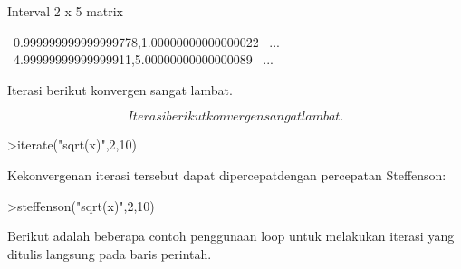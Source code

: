 \documentclass{article}
\begin{document}
\begin{eulernotebook}
\begin{eulercomment}
\begin{eulercomment}
\begin{eulercomment}
\begin{eulercomment}
\begin{eulercomment}
\begin{eulercomment}
\begin{eulercomment}
\begin{eulercomment}
\begin{eulercomment}
\begin{eulercomment}
\begin{eulercomment}
\begin{eulercomment}
\begin{eulercomment}
\begin{eulercomment}
\begin{eulercomment}
\begin{eulercomment}
\begin{eulercomment}
\begin{eulercomment}
\begin{eulercomment}
\begin{eulercomment}
\begin{eulercomment}
\begin{eulercomment}
\begin{eulercomment}
\begin{eulercomment}
\begin{eulercomment}
\begin{eulercomment}
\begin{eulercomment}
\begin{eulercomment}
\begin{eulercomment}
\begin{eulercomment}
\begin{eulercomment}
\begin{eulercomment}
\begin{eulerprompt}
\end{eulerprompt}
\begin{euleroutput}
  Interval 2 x 5 matrix
  
  ~0.999999999999999778,1.00000000000000022~     ...
  ~4.99999999999999911,5.00000000000000089~     ...
\end{euleroutput}
\begin{eulercomment}
Iterasi berikut konvergen sangat lambat.

\end{eulercomment}
\begin{eulerformula}
\[
Iterasi berikut konvergen sangat lambat.
\]
\end{eulerformula}
\begin{eulerprompt}
>iterate("sqrt(x)",2,10)
\end{eulerprompt}
\begin{euleroutput}
  [2,  1.41421,  1.18921,  1.09051,  1.04427,  1.0219,  1.01089,
  1.00543,  1.00271,  1.00135,  1.00068]
\end{euleroutput}
\begin{eulercomment}
Kekonvergenan iterasi tersebut dapat dipercepatdengan percepatan
Steffenson:
\end{eulercomment}
\begin{eulerprompt}
>steffenson("sqrt(x)",2,10)
\end{eulerprompt}
\begin{euleroutput}
  [1.04888,  1.00028,  1,  1]
\end{euleroutput}
\begin{eulercomment}
\begin{eulercomment}
\begin{eulercomment}
Berikut adalah beberapa contoh penggunaan loop untuk melakukan iterasi
yang ditulis langsung pada baris perintah.
\end{eulercomment}

\end{eulercomment}
\end{eulercomment}
\end{eulercomment}
\end{eulercomment}
\end{eulercomment}
\end{eulercomment}
\end{eulercomment}
\end{eulercomment}
\end{eulercomment}
\end{eulercomment}
\end{eulercomment}
\end{eulercomment}
\end{eulercomment}
\end{eulercomment}
\end{eulercomment}
\end{eulercomment}
\end{eulercomment}
\end{eulercomment}
\end{eulercomment}
\end{eulercomment}
\end{eulercomment}
\end{eulercomment}
\end{eulercomment}
\end{eulercomment}
\end{eulercomment}
\end{eulercomment}
\end{eulercomment}
\end{eulercomment}
\end{eulercomment}
\end{eulercomment}
\end{eulercomment}
\end{eulercomment}
\end{eulercomment}
\end{eulercomment}
\end{eulernotebook}
\end{document}
